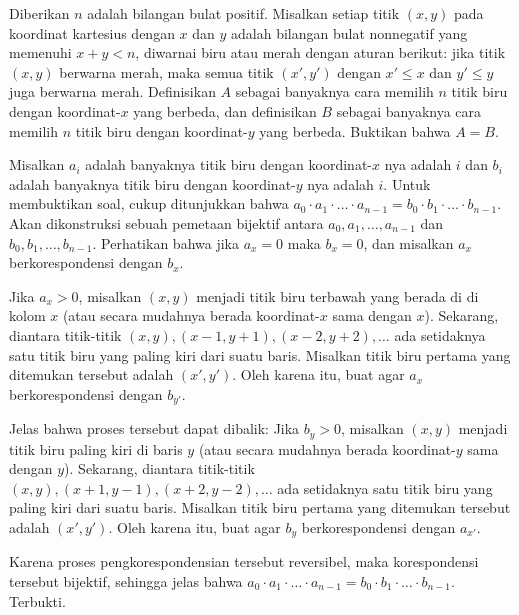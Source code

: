 \documentclass[11pt]{scrartcl}
\begin{document}
\begin{soaljawab}
    Diberikan $n$ adalah bilangan bulat positif. Misalkan setiap titik $(x,y)$ pada koordinat kartesius dengan $x$ dan $y$ adalah bilangan bulat nonnegatif yang memenuhi $x+y < n$, diwarnai biru atau merah dengan aturan berikut: jika titik $(x,y)$ berwarna merah, maka semua titik $(x',y')$ dengan $x' \le x$ dan $y' \le y$ juga berwarna merah. Definisikan $A$ sebagai banyaknya cara memilih $n$ titik biru dengan koordinat-$x$ yang berbeda, dan definisikan $B$ sebagai banyaknya cara memilih $n$ titik biru dengan koordinat-$y$ yang berbeda. Buktikan bahwa $A=B$.
    \begin{solusi}
        Misalkan $a_i$ adalah banyaknya titik biru dengan koordinat-$x$ nya adalah $i$ dan $b_i$ adalah banyaknya titik biru dengan koordinat-$y$ nya adalah $i$. Untuk membuktikan soal, cukup ditunjukkan bahwa $a_0\cdot a_1 \cdot \ldots \cdot a_{n-1} = b_0 \cdot b_1 \cdot \ldots \cdot b_{n-1}$. Akan dikonstruksi sebuah pemetaan bijektif antara $a_0, a_1, \dots, a_{n-1}$ dan $b_0, b_1, \dots, b_{n-1}$. Perhatikan bahwa jika $a_x = 0$ maka $b_x = 0$, dan misalkan $a_x$ berkorespondensi dengan $b_x$. 
        
        Jika $a_x > 0$, misalkan $(x,y)$ menjadi titik biru terbawah yang berada di di kolom $x$ (atau secara mudahnya berada koordinat-$x$ sama dengan $x$). Sekarang, diantara titik-titik $(x,y),(x-1,y+1),(x-2,y+2),\dots$ ada setidaknya satu titik biru yang paling kiri dari suatu baris. Misalkan titik biru pertama yang ditemukan tersebut adalah $(x',y')$. Oleh karena itu, buat agar $a_x$ berkorespondensi dengan $b_{y'}$.

        Jelas bahwa proses tersebut dapat dibalik: Jika $b_y > 0$, misalkan $(x,y)$ menjadi titik biru paling kiri di baris $y$ (atau secara mudahnya berada koordinat-$y$ sama dengan $y$). Sekarang, diantara titik-titik $(x,y),(x+1,y-1),(x+2,y-2),\dots$ ada setidaknya satu titik biru yang paling kiri dari suatu baris. Misalkan titik biru pertama yang ditemukan tersebut adalah $(x',y')$. Oleh karena itu, buat agar $b_y$ berkorespondensi dengan $a_{x'}$.

        Karena proses pengkorespondensian tersebut reversibel, maka korespondensi tersebut bijektif, sehingga jelas bahwa $a_0\cdot a_1 \cdot \ldots \cdot a_{n-1} = b_0 \cdot b_1 \cdot \ldots \cdot b_{n-1}$. Terbukti.
    \end{solusi}
\end{soaljawab}
\end{document}
